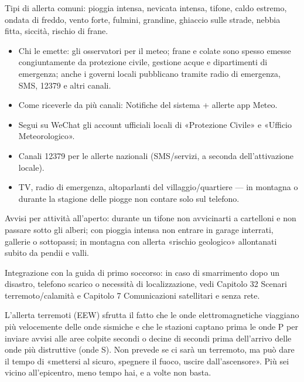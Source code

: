 Tipi di allerta comuni: pioggia intensa, nevicata intensa, tifone, caldo estremo, ondata di freddo, vento forte, fulmini, grandine, ghiaccio sulle strade, nebbia fitta, siccità, rischio di frane.


\begin{itemize}
  \item Chi le emette: gli osservatori per il meteo; frane e colate sono spesso emesse congiuntamente da protezione civile, gestione acque e dipartimenti di emergenza; anche i governi locali pubblicano tramite radio di emergenza, SMS, 12379 e altri canali.
  \item Come riceverle da più canali: Notifiche del sistema + allerte app Meteo.
  \item Segui su WeChat gli account ufficiali locali di «Protezione Civile» e «Ufficio Meteorologico».
  \item Canali 12379 per le allerte nazionali (SMS/servizi, a seconda dell'attivazione locale).
  \item TV, radio di emergenza, altoparlanti del villaggio/quartiere — in montagna o durante la stagione delle piogge non contare solo sul telefono.
\end{itemize}

Avvisi per attività all'aperto: durante un tifone non avvicinarti a cartelloni e non passare sotto gli alberi; con pioggia intensa non entrare in garage interrati, gallerie o sottopassi; in montagna con allerta «rischio geologico» allontanati subito da pendii e valli.

Integrazione con la guida di primo soccorso: in caso di smarrimento dopo un disastro, telefono scarico o necessità di localizzazione, vedi Capitolo 32 Scenari terremoto/calamità e Capitolo 7 Comunicazioni satellitari e senza rete.


L'allerta terremoti (EEW) sfrutta il fatto che le onde elettromagnetiche viaggiano più velocemente delle onde sismiche e che le stazioni captano prima le onde P per inviare avvisi alle aree colpite secondi o decine di secondi prima dell'arrivo delle onde più distruttive (onde S). Non prevede se ci sarà un terremoto, ma può dare il tempo di «mettersi al sicuro, spegnere il fuoco, uscire dall'ascensore». Più sei vicino all'epicentro, meno tempo hai, e a volte non basta.

